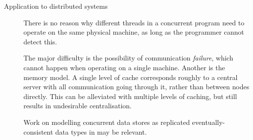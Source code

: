 \begin{description}
\item[Application to distributed systems] \hfill

  There is no reason why different threads in a concurrent program
  need to operate on the same physical machine, as long as the
  programmer cannot detect this.

  The major difficulty is the possibility of communication
  \emph{failure}, which cannot happen when operating on a single
  machine. Another is the memory model. A single level of cache
  corresponds roughly to a central server with all communication going
  through it, rather than between nodes directly. This can be
  alleviated with multiple levels of caching, but still results in
  undesirable centralisation.

  Work on modelling concurrent data stores as replicated
  eventually-consistent data types in \citep{replicated} may be
  relevant.
\end{description}
